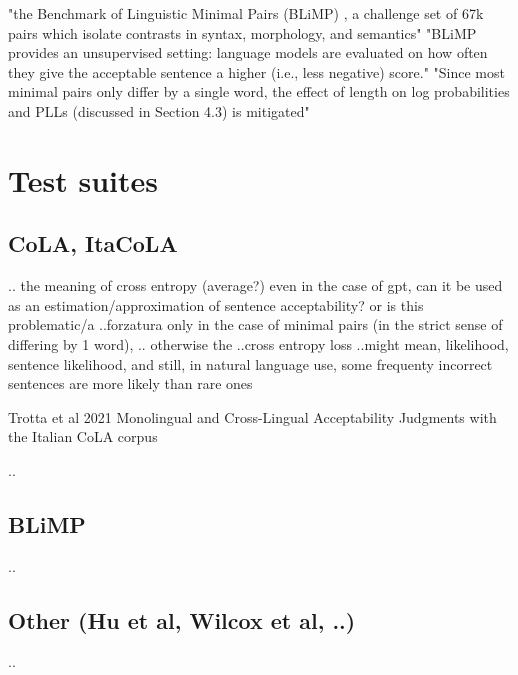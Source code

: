 
"the Benchmark of Linguistic Minimal Pairs (BLiMP) \citep{warstadt2020blimp}, a
challenge set of 67k pairs which isolate contrasts in syntax, morphology, and semantics"  \citep{salazar2020masked} 
"BLiMP provides an unsupervised setting: language models are evaluated on how often they give the acceptable sentence a higher (i.e., less
negative) score." \citep{salazar2020masked} 
"Since most minimal pairs only differ by a single
word, the effect of length on log probabilities and
PLLs (discussed in Section 4.3) is mitigated"  \citep{salazar2020masked} 


\section{Test suites}
\subsection{CoLA, ItaCoLA}
..
the meaning of cross entropy (average?)
even in the case of gpt, can it be used as an estimation/approximation of sentence acceptability?
or is this problematic/a ..forzatura
only in the case of minimal pairs (in the strict sense of differing by 1 word), ..
otherwise the ..cross entropy loss ..might mean, likelihood, sentence likelihood, and still, in natural language use, some frequenty incorrect sentences are more likely than rare ones

Trotta et al 2021 Monolingual and Cross-Lingual Acceptability Judgments with the Italian CoLA corpus

..

\subsection{BLiMP}
..
\subsection{Other (Hu et al, Wilcox et al, ..)}
..


